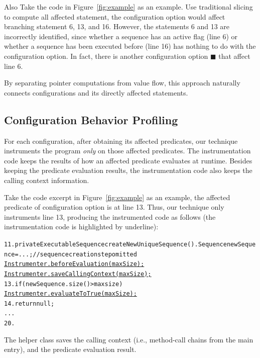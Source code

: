 Also Take the code in Figure~\ref{fig:example} as an example.
Use traditional slicing to compute all affected statement,
the configuration option  would affect
branching statement 6, 13, and 16. However, the
statements 6 and 13 are incorrectly identified, since
whether a sequence has an active flag (line 6) or
whether a sequence has been executed before (line 16)
has nothing to do with the  configuration option.
In fact, there is another configuration option $\blacksquare$
that affect line 6.


By separating pointer computations from value flow,
this approach naturally connects configurations and its
directly affected statements.


\subsection{Configuration Behavior Profiling}
\label{sec:profiling}

For each configuration, after obtaining its affected predicates, our technique
instruments the program \textit{only} on those affected predicates. The instrumentation
code keeps the results of how an affected predicate evaluates at runtime. Besides keeping
the predicate evaluation results, the instrumentation code also keeps
the calling context information.

Take the code excerpt in Figure~\ref{fig:example} as an example, the affected
predicate of configuration option  is at line 13. Thus, our technique
only instruments line 13, producing the instrumented
code as follows (the instrumentation code is highlighted by underline):


\begin{CodeOut}
\begin{alltt}
11. private ExecutableSequence createNewUniqueSequence() .   Sequence newSequence = ...; //sequence creation step omitted
      \underline{Instrumenter.beforeEvaluation(maxSize);}
      \underline{Instrumenter.saveCallingContext(maxSize);}
13.   if (newSequence.size() > maxsize) \ttlcb
        \underline{Instrumenter.evaluateToTrue(maxSize);}
14.     return null;
      ...
20. \ttrcb
\end{alltt}
\end{CodeOut}

The helper class  saves the calling context (i.e.,
method-call chains from the main entry), and the predicate evaluation result.


